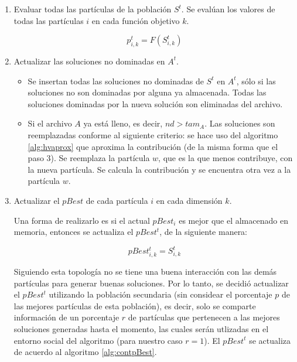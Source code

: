\begin{enumerate}
\begin{enumerate}
\begin{itemize}
  \end{itemize}
  
  \item Evaluar todas las part\'iculas de la poblaci\'on $S^t$. Se eval\'uan los valores de 
     todas las part\'iculas $i$ en cada funci\'on objetivo $k$. 
      
      \[p^t_{i,k} = F \left(S^t_{i,k} \right)\] 
    
  \item Actualizar las soluciones no dominadas en $A^t$. 
  
  \begin{itemize}
   \item Se insertan todas las soluciones no dominadas de $S^t$ en $A^t$, s\'olo si las soluciones no son 
  dominadas por alguna ya almacenada. Todas las soluciones dominadas por la nueva soluci\'on son eliminadas del archivo. 
  
  \item Si el archivo $A$ ya est\'a lleno, es decir, $nd > tam_A$. Las soluciones son reemplazadas conforme al siguiente criterio: 
  se hace uso del algoritmo \ref{alg:hvaprox} que aproxima la contribuci\'on (de la misma forma que el paso $3$). Se reemplaza la 
  part\'icula $w$, que es la que menos contribuye, con la nueva part\'icula. Se calcula la contribuci\'on y
  se encuentra otra vez a la part\'icula $w$.
  
  \end{itemize}
  
  \item Actualizar el $pBest$ de cada part\'icula $i$ en cada dimensi\'on $k$. 
  
  Una forma de realizarlo es si el actual $pBest_i$ es mejor que el almacenado en memoria, entonces se actualiza el $pBest^t$, de la siguiente 
  manera:
  
  \[pBest^t_{i,k} = S^t_{i,k}\]
  
  Siguiendo esta topolog\'ia no se tiene una buena interacci\'on con las dem\'as part\'iculas para generar buenas soluciones. 
  Por lo tanto, se decidi\'o actualizar el $pBest^t$ utilizando la poblaci\'on secundaria (sin considear el porcentaje $p$ de 
  las mejores   part\'iculas de esta poblaci\'on), es decir, solo se comparte informaci\'on de un porcentaje $r$ de part\'iculas 
  que pertenecen a las mejores soluciones generadas hasta el momento, las cuales ser\'an utlizadas en el entorno social del 
  algoritmo (para nuestro caso $r=1$). El $pBest^t$ se actualiza de acuerdo al algoritmo \ref{alg:contpBest}.
  

\end{enumerate}
\end{enumerate}
